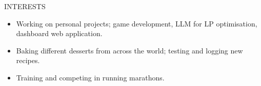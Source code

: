 
\begin{ResumeSection}{INTERESTS}
    \begin{itemize}
        \item Working on personal projects; game development, LLM for LP optimisation, dashboard web application.
        \vspace{-0.5em}
        \item Baking different desserts from across the world; testing and logging new recipes.
        \vspace{-0.5em}
        \item Training and competing in running marathons.
    \end{itemize} 
\end{ResumeSection}